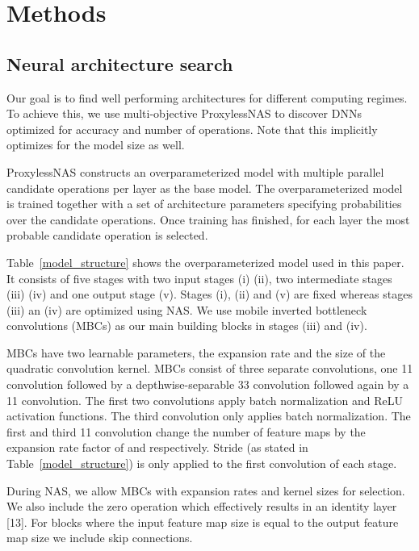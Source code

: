 \documentclass[a4paper]{article}
\begin{document}
\section{Methods}
\label{sec:methods}

\subsection{Neural architecture search}
Our goal is to find well performing architectures for different computing regimes. To achieve this, we use multi-objective ProxylessNAS \cite{Cai2019} to discover DNNs optimized for accuracy and number of operations. Note that this implicitly optimizes for the model size as well.

ProxylessNAS constructs an overparameterized model with multiple parallel candidate operations per layer as the base model. The overparameterized model is trained together with a set of architecture parameters specifying probabilities over the candidate operations. Once training has finished, for each layer the most probable candidate operation is selected.

Table~\ref{model_structure} shows the overparameterized model used in this paper. It consists of five stages with two input stages (i) (ii), two intermediate stages (iii) (iv) and one output stage (v). Stages (i), (ii) and (v) are fixed whereas stages (iii) an (iv) are optimized using NAS. We use mobile inverted bottleneck convolutions (MBCs) \cite{Sandler2018} as our main building blocks in stages (iii) and (iv).

MBCs have two learnable parameters, the expansion rate  and the size  of the quadratic  convolution kernel. MBCs consist of three separate convolutions, one 11 convolution followed by a depthwise-separable 33 convolution followed again by a 11 convolution. The first two convolutions apply batch normalization and ReLU activation functions. The third convolution only applies batch normalization. The first and third 11 convolution change the number of feature maps by the expansion rate factor of  and  respectively. Stride (as stated in Table~\ref{model_structure}) is only applied to the first convolution of each stage.

During NAS, we allow MBCs with expansion rates  and kernel sizes  for selection. We also include the zero operation which effectively results in an identity layer [13]. For blocks where the input feature map size is equal to the output feature map size we include skip connections.
\end{document}
